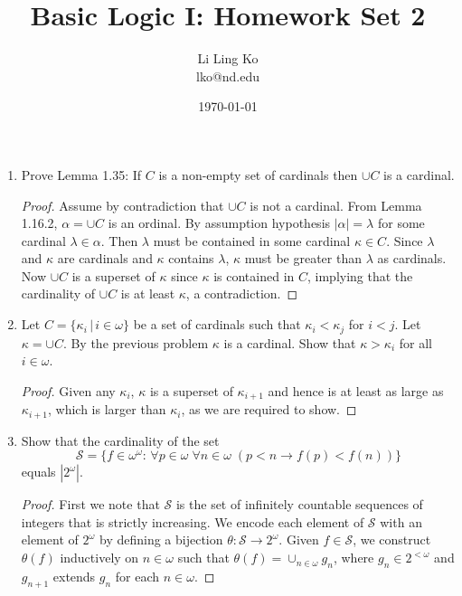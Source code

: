 \documentclass{article}
\begin{document}
\title{Basic Logic I: Homework Set 2}
\author{Li Ling Ko\\ lko@nd.edu}
\date{\today}
\maketitle

\begin{enumerate}
  \item Prove Lemma 1.35: If $C$ is a non-empty set of cardinals then
    $\cup C$ is a cardinal.

    \begin{proof}
      Assume by contradiction that $\cup C$ is not a cardinal. 
      From Lemma 1.16.2, $\alpha=\cup C$ is an ordinal. By assumption
      hypothesis $|\alpha|=\lambda$ for some cardinal $\lambda\in\alpha$.
      Then $\lambda$ must be contained in some cardinal $\kappa\in C$.
      Since $\lambda$ and $\kappa$ are cardinals and $\kappa$ contains
      $\lambda$, $\kappa$ must be greater than $\lambda$ as cardinals. Now
      $\cup C$ is a superset of $\kappa$ since $\kappa$ is contained in
      $C$, implying that the cardinality of $\cup C$ is at least $\kappa$,
      a contradiction.
    \end{proof}

  \item Let $C=\{\kappa_i\,|\, i\in\omega\}$ be a set of cardinals such
    that $\kappa_i<\kappa_j$ for $i<j$. Let $\kappa=\cup C$. By the
    previous problem $\kappa$ is a cardinal. Show that $\kappa>\kappa_i$
    for all $i\in\omega$.

    \begin{proof}
      Given any $\kappa_i$, $\kappa$ is a superset of $\kappa_{i+1}$ and
      hence is at least as large as $\kappa_{i+1}$, which is larger than
      $\kappa_i$, as we are required to show.
    \end{proof}

  \item Show that the cardinality of the set
    \begin{equation*}
      \mathcal{S}=\{f\in\omega^\omega:\, \forall p\in\omega\; \forall
      n\in\omega\; (p<n\rightarrow f(p)<f(n))\}
    \end{equation*}
    equals $|2^\omega|$.

    \begin{proof}
      First we note that $\mathcal{S}$ is the set of infinitely countable
      sequences of integers that is strictly increasing. We encode each
      element of $\mathcal{S}$ with an element of $2^\omega$ by defining a
      bijection $\theta:\mathcal{S}\rightarrow2^\omega$. Given
      $f\in\mathcal{S}$, we construct $\theta(f)$ inductively on
      $n\in\omega$ such that $\theta(f)=\cup_{n\in\omega}g_n$, where
      $g_n\in2^{<\omega}$ and $g_{n+1}$ extends $g_n$ for each
      $n\in\omega$.


\end{proof}
\end{enumerate}
\end{document}

